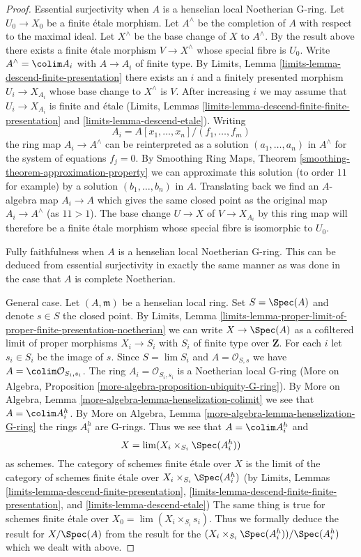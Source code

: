 \begin{proof}
\medskip\noindent
Essential surjectivity when $A$ is a henselian local Noetherian G-ring.
Let $U_0 \to X_0$ be a finite \'etale morphism.
Let $A^\wedge$ be the completion of $A$ with respect to the maximal ideal.
Let $X^\wedge$ be the base change of $X$ to $A^\wedge$.
By the result above there exists a finite \'etale morphism
$V \to X^\wedge$ whose special fibre is $U_0$.
Write $A^\wedge = \colim A_i$ with $A \to A_i$ of finite type.
By Limits, Lemma \ref{limits-lemma-descend-finite-presentation}
there exists an $i$ and a finitely presented morphism $U_i \to X_{A_i}$
whose base change to $X^\wedge$ is $V$. After increasing $i$
we may assume that $U_i \to X_{A_i}$ is finite and \'etale
(Limits, Lemmas \ref{limits-lemma-descend-finite-finite-presentation} and
\ref{limits-lemma-descend-etale}). Writing
$$
A_i = A[x_1, \ldots, x_n]/(f_1, \ldots, f_m)
$$
the ring map $A_i \to A^\wedge$ can be reinterpreted as a solution
$(a_1, \ldots, a_n)$ in $A^\wedge$ for the system of equations $f_j = 0$.
By Smoothing Ring Maps, Theorem \ref{smoothing-theorem-approximation-property}
we can approximate this solution (to order $11$ for example) by a solution
$(b_1, \ldots, b_n)$ in $A$. Translating back we find an $A$-algebra map
$A_i \to A$ which gives the same closed point as the original map
$A_i \to A^\wedge$ (as $11 > 1$). The base change $U \to X$ of $V \to X_{A_i}$
by this ring map will therefore be a finite \'etale morphism whose
special fibre is isomorphic to $U_0$.

\medskip\noindent
Fully faithfulness when $A$ is a henselian local Noetherian G-ring.
This can be deduced from essential surjectivity in exactly the same
manner as was done in the case that $A$ is complete Noetherian.

\medskip\noindent
General case. Let $(A, \mathfrak m)$ be a henselian local ring.
Set $S = \Spec(A)$ and denote $s \in S$ the closed point. By Limits, Lemma
\ref{limits-lemma-proper-limit-of-proper-finite-presentation-noetherian}
we can write $X \to \Spec(A)$ as a cofiltered limit of
proper morphisms $X_i \to S_i$ with $S_i$ of finite type over $\mathbf{Z}$.
For each $i$ let $s_i \in S_i$ be the image of $s$.
Since $S = \lim S_i$ and $A = \mathcal{O}_{S, s}$ we have
$A = \colim \mathcal{O}_{S_i, s_i}$. The ring $A_i = \mathcal{O}_{S_i, s_i}$
is a Noetherian local G-ring (More on Algebra, Proposition
\ref{more-algebra-proposition-ubiquity-G-ring}).
By More on Algebra, Lemma \ref{more-algebra-lemma-henselization-colimit}
we see that $A = \colim A_i^h$. By
More on Algebra, Lemma \ref{more-algebra-lemma-henselization-G-ring}
the rings $A_i^h$ are G-rings. Thus we see that $A = \colim A_i^h$ and
$$
X = \lim (X_i \times_{S_i} \Spec(A_i^h))
$$
as schemes. The category of schemes finite \'etale over $X$ is the limit
of the category of schemes finite \'etale over
$X_i \times_{S_i} \Spec(A_i^h)$ (by
Limits, Lemmas
\ref{limits-lemma-descend-finite-presentation},
\ref{limits-lemma-descend-finite-finite-presentation}, and
\ref{limits-lemma-descend-etale})
The same thing is true for schemes finite \'etale over
$X_0 = \lim (X_i \times_{S_i} s_i)$.
Thus we formally deduce the result for $X / \Spec(A)$
from the result for the $(X_i \times_{S_i} \Spec(A_i^h)) / \Spec(A_i^h)$
which we dealt with above.
\end{proof}


